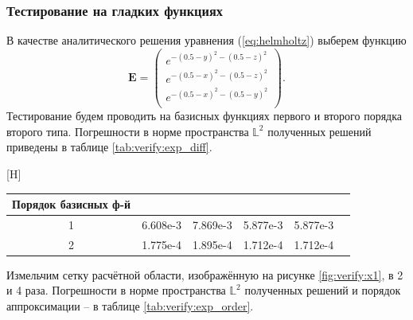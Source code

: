 \documentclass[a4paper,14pt]{article}
\makeatletter
\renewenvironment{table}[1][\fps@table]{
  \edef\@tempa{\noexpand\@float{table}[#1]}
  \@tempa
  \addtocounter{footable}{1}
}{
  \end@float
}
\makeatother
\begin{document}

\subsubsection{Тестирование на гладких функциях}

В качестве аналитического решения уравнения (\ref{eq:helmholtz}) выберем функцию
\begin{equation}
	\mathbf{E} = \left( \begin{array}{c}
		e^{-(0.5-y)^2 -(0.5-z)^2} \\
		e^{-(0.5-x)^2 -(0.5-z)^2} \\
		e^{-(0.5-x)^2 -(0.5-y)^2} \\
	\end{array} \right) .
	\label{eq:verify:exp_solution}
\end{equation}
Тестирование будем проводить на базисных функциях первого и второго порядка второго типа. Погрешности в норме пространства $\mathbb{L}^2$ полученных решений приведены в таблице \ref{tab:verify:exp_diff}.

\begin{table}[H]
	\caption{относительные погрешности в норме $\mathbb{L}^2$}
	\label{tab:verify:exp_diff}
	\begin{tabularx}{\textwidth}{|C{1}|C{1}|C{1}|C{1}|C{1}|C{1}|}
		\hline Порядок базисных ф-й &  &  &  &  \\
		 & 6.608e-3 & 7.869e-3 & 5.877e-3 & 5.877e-3 \\
		 & 1.775e-4 & 1.895e-4 & 1.712e-4 & 1.712e-4 \\
		\hline
	\end{tabularx}
\end{table}
\vspace{-0.5cm}

Измельчим сетку расчётной области, изображённую на рисунке \ref{fig:verify:x1}, в 2 и 4 раза. Погрешности в норме пространства $\mathbb{L}^2$ полученных решений и порядок аппроксимации -- в таблице \ref{tab:verify:exp_order}.
\end{document}
